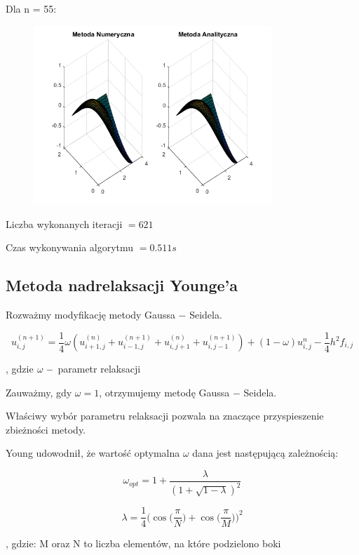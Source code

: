 Dla n = 55:

\begin{figure}[!ht]
	\begin{center}
		\includegraphics[width=0.8\textwidth]{Lab6/charts/gs/zad2/55.png}
	\end{center}
\end{figure}

Liczba wykonanych iteracji $ = 621 $

Czas wykonywania algorytmu $ = 0.511 s$
\newpage
\subsection{Metoda nadrelaksacji Younge'a}

Rozważmy modyfikację metody Gaussa $-$ Seidela.

$$u_{i,j}^{(n+1)} = \frac{1}{4}\omega(u_{i+1,j}^{(n)} + u_{i-1,j}^{(n+1)} + u_{i,j+1}^{(n)} + u_{i,j-1}^{(n+1)}) + (1-\omega)u^n_{i,j} - \frac{1}{4}h^2f_{i,j}$$

, gdzie $\omega \hspace{0.1cm} -$ parametr relaksacji

Zauważmy, gdy $\omega = 1$, otrzymujemy metodę Gaussa $-$ Seidela. 

Właściwy wybór parametru relaksacji pozwala na znaczące przyspieszenie zbieżności metody.

Young udowodnił, że wartość optymalna $\omega$ dana jest następującą zależnością:

$$\omega_{opt}=1+\dfrac{\lambda}{(1+\sqrt{1-\lambda})^2}$$

$$\lambda = \dfrac{1}{4}\Big(\cos\Big(\dfrac{\pi}{N}\Big) + \cos\Big(\dfrac{\pi}{M}\Big)\Big)^2$$

, gdzie: M oraz N to liczba elementów, na które podzielono boki

